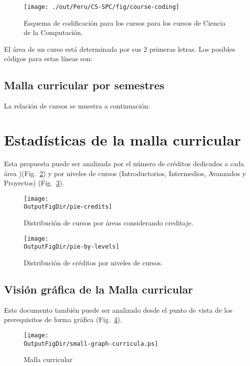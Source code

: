 \begin{figure}[ht]
   \centering
      \texttt{[image: ./out/Peru/CS-SPC/fig/course-coding]} 
   \caption{Esquema de codificación para los cursos para los cursos de Ciencia de la Computación.}
   \label{fig:cs-course-number}
\end{figure}

El área de un curso está determinada por sus 2 primeras letras. Los posibles códigos para estas líneas son:


\begin{landscape}
\section{Malla curricular por semestres}\label{sec:courses-by-semester}
La relación de cursos se muestra a continuación:


\end{landscape}

\section{Estadísticas de la malla curricular}
Esta propuesta puede ser analizada por el número de créditos dedicados a cada área )(Fig.~\ref{fig:pie-credits}) %
y por niveles de cursos (Introductorios, Intermedios, Avanzados y Proyectos) (Fig.~\ref{fig:pie-by-levels}).

\vspace{0.5cm}
\begin{figure}[h!]
      \centering
      \texttt{[image: \\OutputFigDir/pie-credits]}
      \label{fig:pie-credits}
      \caption{Distribución de cursos por áreas considerando creditaje.}
\end{figure}

\begin{figure}[h!]
      \centering
      \texttt{[image: \\OutputFigDir/pie-by-levels]}
      \label{fig:pie-by-levels}
      \caption{Distribución de créditos por niveles de cursos.}
\end{figure}

\begin{landscape}
\section{Visión gráfica de la Malla curricular}\label{sec:graphic-small-curricula}
\vspace{-0.3cm}Este documento también puede ser analizado desde el punto de vista de los 
prerequisitos de forma gráfica (Fig.~\ref{fig:graphic-small-curricula}).
\begin{figure}[h!]
	\texttt{[image: \\OutputFigDir/small-graph-curricula.ps]}
	\label{fig:graphic-small-curricula}
	\caption{Malla curricular \SchoolFullName}
\end{figure}
\end{landscape}

